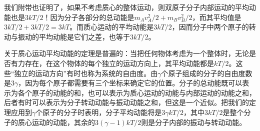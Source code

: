 我们附带也证明了，如果不考虑质心的整体运动，则双原子分子内部运动的平均动能也是$3kT/2$！因为分子各部分的总动能是$m_Av_A^2/2 + m_Bv_B^2/2$，而其平均值是$3kT/2+3kT/2=3kT$。而质心运动的平均动能是$3kT/2$，因而分子中两个原子的转动与振动的平均动能是它们之差，也等于$3kT/2$。

关于质心运动平均动能的定理是普遍的：当把任何物体考虑为一个整体时，无论是否有力存在，在这个物体的每个独立的运动方向上，其平均动能都是$kT/2$。这些“独立的运动方向”有时也称为系统的自由度。由$\gamma$个原子组成的分子的自由度数是$3\gamma$，因为每个原子都需要有三个坐标来确定它的位置。分子的总动能既可以表示为各个原子的动能的和，也可以表示为质心运动的动能与内部运动的动能之和，后者有时可以表示为分子转动动能与振动动能之和，但这是一个近似。把我们的定理应用到$\gamma$个原子的分子时表明，分子平均动能将是$3\gamma kT/2$，其中$3kT/2$是整个分子的质心运动的动能，其余的$3(\gamma-1)kT/2$则是分子内部的振动与转动动能。
